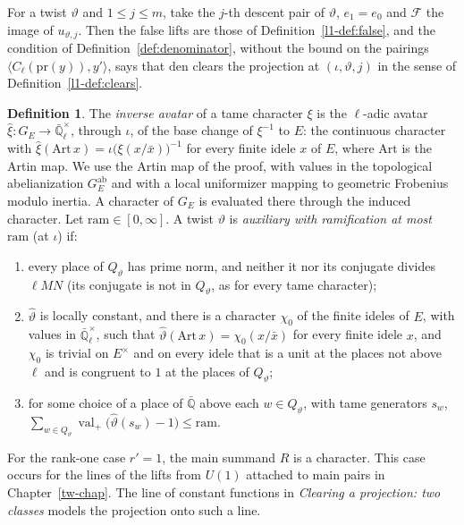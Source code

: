 \documentclass[reqno]{amsart}
\newcounter{chap}
\theoremstyle{definition}
\newtheorem{definition}{Definition}[section]
\theoremstyle{plain}
\newcommand{\Q}{\mathbb{Q}}
\newcommand{\pr}{\mathrm{pr}}
\newcommand{\val}{\operatorname{val}}
\begin{document}
For a twist \(\vartheta\) and \(1 \le j \le m\), take the \(j\)-th descent pair of \(\vartheta\), \(e_1 = e_0\) and \(\mathcal F\) the image of \(u_{\vartheta,j}\).  Then the false lifts are those of Definition~\ref{l1-def:false}, and the condition of Definition~\ref{def:denominator}, without the bound on the pairings \(\langle C_\ell(\pr(y)), y'\rangle\), says that \(\mathrm{den}\) clears the projection at \((\iota, \vartheta, j)\) in the sense of Definition~\ref{l1-def:clears}.

\begin{definition}\label{def:aux-twist}
The \emph{inverse avatar} of a tame character \(\xi\) is the \(\ell\)-adic avatar \(\hat\xi \colon G_E \to \bar{\Q}_\ell^\times\), through \(\iota\), of the base change of \(\xi^{-1}\) to \(E\): the continuous character with \(\hat\xi(\mathrm{Art}\,x) = \iota\bigl(\xi(x/\bar x)\bigr)^{-1}\) for every finite idele \(x\) of \(E\), where \(\mathrm{Art}\) is the Artin map.  We use the Artin map of the proof, with values in the topological abelianization \(G_E^{\mathrm{ab}}\) and with a local uniformizer mapping to geometric Frobenius modulo inertia.  A character of \(G_E\) is evaluated there through the induced character.  Let \(\mathrm{ram} \in [0, \infty]\).  A twist \(\vartheta\) is \emph{auxiliary with ramification at most \(\mathrm{ram}\)} (at \(\iota\)) if:
\begin{enumerate}
\item[(a)] every place of \(Q_\vartheta\) has prime norm, and neither it nor its conjugate divides \(\ell MN\) (its conjugate is not in \(Q_\vartheta\), as for every tame character);
\item[(b)] \(\hat\vartheta\) is locally constant, and there is a character \(\chi_0\) of the finite ideles of \(E\), with values in \(\bar{\Q}_\ell^\times\), such that \(\hat\vartheta(\mathrm{Art}\,x) = \chi_0(x/\bar x)\) for every finite idele \(x\), and \(\chi_0\) is trivial on \(E^\times\) and on every idele that is a unit at the places not above \(\ell\) and is congruent to \(1\) at the places of \(Q_\vartheta\);
\item[(c)] for some choice of a place of \(\bar{\Q}\) above each \(w \in Q_\vartheta\), with tame generators \(s_w\), \(\sum_{w \in Q_\vartheta} \val_+\bigl(\hat\vartheta(s_w) - 1\bigr) \le \mathrm{ram}\).
\end{enumerate}
\end{definition}

For the rank-one case \(r'=1\), the main summand \(R\) is a character.  This case occurs for the lines of the lifts from \(U(1)\) attached to main pairs in Chapter~\ref{tw-chap}.  The line of constant functions in \emph{Clearing a projection: two classes} models the projection onto such a line.
\end{document}
